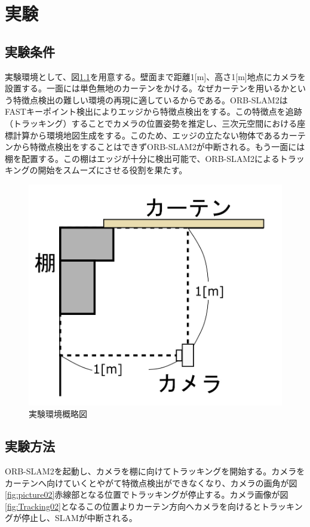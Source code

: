 \chapter{実験}\label{chap:test}

\section{実験条件}

実験環境として、図\ref{fig:picture01}を用意する。壁面まで距離1[m]、高さ1[m]地点にカメラを設置する。一面には単色無地のカーテンをかける。なぜカーテンを用いるかという特徴点検出の難しい環境の再現に適しているからである。ORB-SLAM2はFASTキーポイント検出によりエッジから特徴点検出をする。この特徴点を追跡（トラッキング）することでカメラの位置姿勢を推定し、三次元空間における座標計算から環境地図生成をする。このため、エッジの立たない物体であるカーテンから特徴点検出をすることはできずORB-SLAM2が中断される。もう一面には棚を配置する。この棚はエッジが十分に検出可能で、ORB-SLAM2によるトラッキングの開始をスムーズにさせる役割を果たす。

\begin{figure}[h]
        \begin{center}
        \includegraphics[width=0.7\linewidth]{figs/picture01.jpg}
        \caption{実験環境概略図}
        \label{fig:picture01}
        \end{center}
\end{figure}


\section{実験方法}

ORB-SLAM2を起動し、カメラを棚に向けてトラッキングを開始する。カメラをカーテンへ向けていくとやがて特徴点検出ができなくなり、カメラの画角が図\ref{fig:picture02}赤線部となる位置でトラッキングが停止する。カメラ画像が図\ref{fig:Tracking02}となるこの位置よりカーテン方向へカメラを向けるとトラッキングが停止し、SLAMが中断される。

